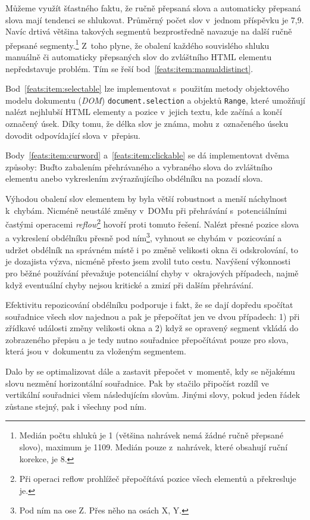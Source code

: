 Můžeme využít šťastného faktu, že ručně přepsaná slova a automaticky přepsaná
slova mají tendenci se shlukovat. Průměrný počet slov v~jednom příspěvku je 7,9.
Navíc drtivá většina takových segmentů bezprostředně navazuje na další ručně
přepsané segmenty.\footnote{Medián počtu shluků je 1 (většina nahrávek nemá
žádné ručně přepsané slovo), maximum je 1109. Medián pouze z~nahrávek, které
obsahují ruční korekce, je 8.}
Z~toho plyne, že obalení každého souvislého shluku manuálně či automaticky
přepsaných slov do zvláštního HTML elementu nepředstavuje problém. Tím se řeší
bod~\ref{feats:item:manualdistinct}.

Bod~\ref{feats:item:selectable} lze implementovat s~použitím metody objektového
modelu dokumentu ({\em DOM}) \texttt{document.selection} a objektů
\texttt{Range}, které umožňují nalézt nejhlubší HTML elementy a pozice v~jejich
textu, kde začíná a končí označený úsek. Díky tomu, že délka slov je známa, mohu
z~označeného úseku dovodit odpovídající slova v~přepisu.

Body~\ref{feats:item:curword} a~\ref{feats:item:clickable} se dá implementovat
dvěma způsoby: Buďto zabalením přehrávaného a vybraného slova do zvláštního
elementu anebo vykreslením zvýrazňujícího obdélníku na pozadí slova.

Výhodou obalení slov elementem by byla větší robustnost a menší náchylnost
k~chybám. Nicméně neustálé změny v~DOMu při přehrávání s~potenciálními častými
operacemi {\em reflow}\footnote{Při operaci reflow prohlížeč přepočítává pozice
všech elementů a překresluje je.} hovoří proti tomuto řešení. Nalézt přesné
pozice slova a vykreslení obdélníku přesně pod ním\footnote{Pod ním na ose Z.
Přes něho na osách X, Y.}, vyhnout se chybám v~pozicování a udržet
obdélník na správném místě i po změně velikosti okna či odskrolování, to je
dozajista výzva, nicméně přesto jsem zvolil tuto cestu. Navýšení výkonnosti pro
běžné používání převažuje potenciální chyby v~okrajových případech, najmě když
eventuální chyby nejsou kritické a zmizí při dalším přehrávání.

Efektivitu repozicování obdélníku podporuje i fakt, že se dají dopředu spočítat
souřadnice všech slov najednou a pak je přepočítat jen ve dvou případech:
1) při zřídkavé události změny velikosti okna a
2) když se opravený segment vkládá do zobrazeného přepisu a je tedy
nutno souřadnice přepočítávat pouze pro slova, která jsou v~dokumentu za
vloženým segmentem.

Dalo by se optimalizovat dále a zastavit přepočet
v~momentě, kdy se nějakému slovu nezmění horizontální souřadnice. Pak by stačilo
připočíst rozdíl ve vertikální souřadnici všem následujícím slovům. Jinými
slovy, pokud jeden řádek zůstane stejný, pak i všechny pod ním.


